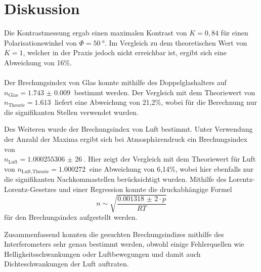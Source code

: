 \section{Diskussion}
\label{sec:Diskussion}
Die Kontrastmessung ergab einen maximalen Kontrast von $K=0,84$ für einen Polarisationswinkel von $\Phi=\SI{50}{\degree}$.
Im Vergleich zu dem theoretischen Wert von $K=1$, welcher in der Praxis jedoch nicht erreichbar ist, ergibt sich eine
Abweichung von 16\%.
\\
\\
Der Brechungsindex von Glas konnte mithilfe des Doppelglashalters auf\\
$n_\text{Glas}=\SI{1.743(9)}{}$ bestimmt werden.
Der Vergleich mit dem Theoriewert von \\
$n_\text{Theorie}=\SI{1,613}{}$ \cite{ns}
liefert eine Abweichung von 21,2\%, wobei für die Berechnung nur die signifikanten Stellen verwendet wurden.

Des Weiteren wurde der Brechungsindex von Luft bestimmt. Unter Verwendung der Anzahl der Maxima ergibt
sich bei Atmosphärendruck ein Brechungsindex von\\
$n_\text{Luft}=\SI{1,000255306(26)}{}$.
Hier zeigt der Vergleich mit dem Theoriewert für Luft von $n_\text{Luft,Theorie}=\SI{1,000272}{}$ \cite{ns}
eine Abweichung von 6,14\%, wobei hier ebenfalls nur die signifikanten Nachkommastellen
berücksichtigt wurden.
Mithilfe des Lorentz-Lorentz-Gesetzes und einer Regression konnte die druckabhängige Formel
\begin{equation}
    n\sim\sqrt{\frac{\SI{0,001318(2)}\cdot p}{RT}}
\end{equation}
für den Brechungsindex aufgestellt werden.

Zusammenfassend konnten die gesuchten Brechungsindizes mithilfe des Interferometers sehr genau bestimmt werden, obwohl
einige Fehlerquellen wie Helligkeitsschwankungen oder Luftbewegungen und damit auch Dichteschwankungen der Luft auftraten.
